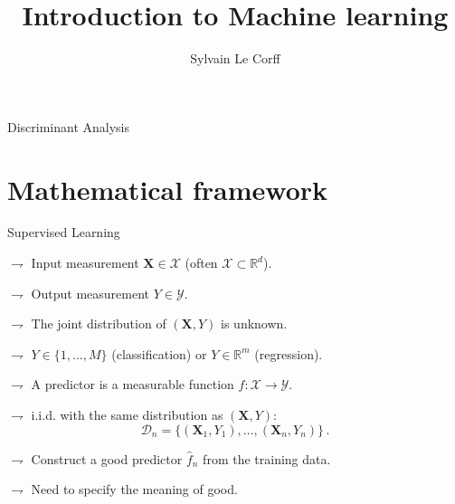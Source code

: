 \documentclass[xcolor={usenames,dvipsnames},handout]{beamer}
\begin{document}
\title[]{Introduction to Machine learning}
\author[S.~Le Corff]{Sylvain Le Corff}
\date{}

\begin{frame}[plain]
\titlepage
\end{frame}


\begin{frame}{Discriminant Analysis}
\tableofcontents
\end{frame}



\section{Mathematical framework}


\begin{frame}{Supervised  Learning}

$\rightharpoondown$ \alert{Input} measurement $\textbf{X}  \in \mathcal{X}$ (often $\mathcal{X} \subset \mathbb{R}^d$).

$\rightharpoondown$  \alert{Output} measurement $Y \in \mathcal{Y}$.

$\rightharpoondown$  The joint distribution of $(\textbf{X},Y)$ is  \alert{unknown}.

$\rightharpoondown$  $Y \in \{1,\ldots,M\}$ (classification) or $Y \in \mathbb{R}^m$ (regression).


$\rightharpoondown$ A \alert{predictor} is a measurable function $f:\mathcal{X} \to \mathcal{Y}$.

\vspace{.5cm}


$\rightharpoondown$ i.i.d. with the same distribution as $(\textbf{X},Y)$:
$$\mathcal{D}_n=\{(\textbf{X}_1, Y_1),\ldots,(\textbf{X}_n, Y_n)\}\,.$$ 




\vspace{.5cm}


$\rightharpoondown$  Construct a \alert{good} predictor $\widehat{f}_n$ from the training data.

$\rightharpoondown$  Need to specify the meaning of good.

\end{frame}
\end{document}
